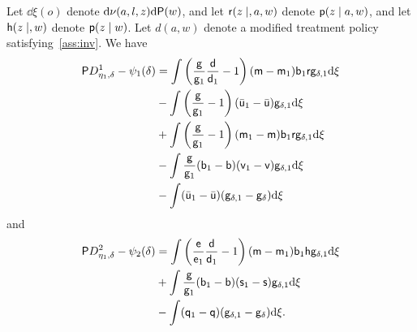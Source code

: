 \begin{lemma}\label{lemma:so1}
  Let $\dd\xi(o)$ denote $\mathrm{d}\nu(a,l,z)\mathrm{d}\mathsf{P}(w)$, and let $\mathsf{r}(z\mid,
  a, w)$ denote $\mathsf{p}(z\mid a, w)$, and let $\mathsf{h}(z\mid,
  w)$ denote $\mathsf{p}(z\mid w)$. Let $d(a,w)$ denote a modified treatment
  policy satisfying~\ref{ass:inv}. We have
  \begin{align}
    \mathsf{P} D_{\eta_1,\delta}^1 -\psi_1(\delta) & =
         \int\left(\frac{\mathsf{g}}{\mathsf{g}_1}\frac{\mathsf{d}}{\mathsf{d}_1} -
        1\right)(\mathsf{m}-\mathsf{m}_1)\mathsf{b}_1\mathsf{r}\mathsf{g}_{\delta,1}\mathrm{d}\xi\label{eq:so1}\\
        &-\int\left(\frac{\mathsf{g}}{\mathsf{g}_1}-1\right)(\bar{\mathsf{u}}_1-\bar{\mathsf{u}})
        \mathsf{g}_{\delta,1}\mathrm{d}\xi\label{eq:so3}\\
         &+\int\left(\frac{\mathsf{g}}{\mathsf{g}_1}-1\right)(\mathsf{m}_1-\mathsf{m})\mathsf{b}_1\mathsf{r}
         \mathsf{g}_{\delta,1}\mathrm{d}\xi\label{eq:so4}\\
         &-\int\frac{\mathsf{g}}{\mathsf{g}_1}(\mathsf{b}_1-\mathsf{b})(\mathsf{v}_1-\mathsf{v})\mathsf{g}_{\delta,1}
         \mathrm{d}\xi\label{eq:so5}\\
        &-\int(\bar{\mathsf{u}}_1-\bar{\mathsf{u}})(\mathsf{g}_{\delta,1}-\mathsf{g}_\delta)
        \mathrm{d}\xi\label{eq:so2}
  \end{align}
  and
  \begin{align*}
    \mathsf{P} D_{\eta_1,\delta}^2 - \psi_2(\delta)
    & = \int\left(\frac{\mathsf{e}}{\mathsf{e}_1}\frac{\mathsf{d}}{\mathsf{d}_1} -
      1\right)(\mathsf{m}-\mathsf{m}_1)\mathsf{b}_1\mathsf{h}\mathsf{g}_{\delta,1} \mathrm{d}\xi\\
    &+\int\frac{\mathsf{g}}{\mathsf{g}_1}(\mathsf{b}_1-\mathsf{b})(\mathsf{s}_1-\mathsf{s})\mathsf{g}_{\delta,1}\mathrm{d}\xi\\
    &-\int(\mathsf{q}_1-\mathsf{q})(\mathsf{g}_{\delta,1}-\mathsf{g}_\delta)\mathrm{d}\xi.
  \end{align*}
\end{lemma}

